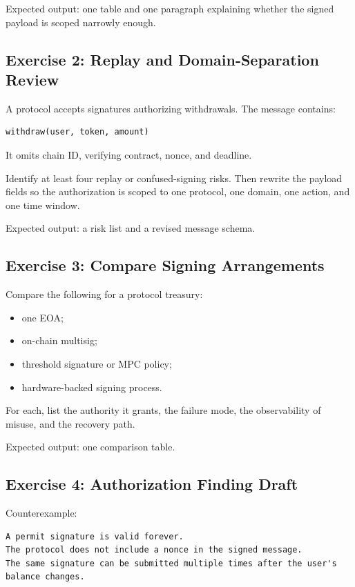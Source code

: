 Expected output: one table and one paragraph explaining whether the signed payload is scoped narrowly enough.

\subsection{Exercise 2: Replay and Domain-Separation Review}

A protocol accepts signatures authorizing withdrawals. The message contains:

\begin{lstlisting}
withdraw(user, token, amount)
\end{lstlisting}

It omits chain ID, verifying contract, nonce, and deadline.

Identify at least four replay or confused-signing risks. Then rewrite the payload fields so the authorization is scoped to one protocol, one domain, one action, and one time window.

Expected output: a risk list and a revised message schema.

\subsection{Exercise 3: Compare Signing Arrangements}

Compare the following for a protocol treasury:

\begin{itemize}
\tightlist
\item
  one EOA;
\item
  on-chain multisig;
\item
  threshold signature or MPC policy;
\item
  hardware-backed signing process.
\end{itemize}

For each, list the authority it grants, the failure mode, the observability of misuse, and the recovery path.

Expected output: one comparison table.

\subsection{Exercise 4: Authorization Finding Draft}

Counterexample:

\begin{lstlisting}
A permit signature is valid forever.
The protocol does not include a nonce in the signed message.
The same signature can be submitted multiple times after the user's balance changes.
\end{lstlisting}

